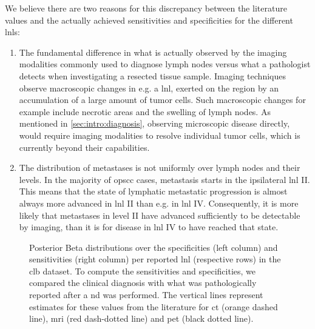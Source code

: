\documentclass[\relativeRoot/main.tex]{subfiles}
\begin{document}
We believe there are two reasons for this discrepancy between the literature values and the actually achieved sensitivities and specificities for the different \glspl{lnl}:

\begin{enumerate}
    \item The fundamental difference in what is actually observed by the imaging modalities commonly used to diagnose lymph nodes versus what a pathologist detects when investigating a resected tissue sample. Imaging techniques observe macroscopic changes in e.g. a \gls{lnl}, exerted on the region by an accumulation of a large amount of tumor cells. Such macroscopic changes for example include necrotic areas and the swelling of lymph nodes. As mentioned in \cref{sec:intro:diagnosis}, observing microscopic disease directly, would require imaging modalities to resolve individual tumor cells, which is currently beyond their capabilities.
    \item The distribution of metastases is not uniformly over lymph nodes and their levels. In the majority of \gls{opscc} cases, metastasis starts in the ipsilateral \gls{lnl} II. This means that the state of lymphatic metastatic progression is almost always more advanced in \gls{lnl} II than e.g. in \gls{lnl} IV. Consequently, it is more likely that metastases in level II have advanced sufficiently to be detectable by imaging, than it is for disease in \gls{lnl} IV to have reached that state.
\end{enumerate}

\begin{figure}
    \centering
    \def\svgwidth{1.0\textwidth}
    
    \caption[
        Sensitivity and specificity per LNL in the CLB dataset
    ]{
        Posterior Beta distributions over the specificities (left column) and sensitivities (right column) per reported \gls{lnl} (respective rows) in the \gls{clb} dataset. To compute the sensitivities and specificities, we compared the clinical diagnosis with what was pathologically reported after a \gls{nd} was performed. The vertical lines represent estimates for these values from the literature \cite{de_bondt_detection_2007,kyzas_18f-fluorodeoxyglucose_2008} for \gls{ct} (orange dashed line), \gls{mri} (red dash-dotted line) and \gls{pet} (black dotted line).
    }
    \label{fig:dataset_clb:sens_spec}
\end{figure}
\end{document}
